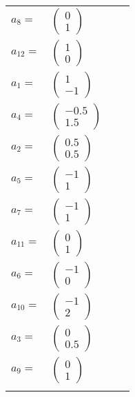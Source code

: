 \documentclass[1p]{elsarticle_modified}
\theoremstyle{definition}
\begin{document}
\begin{tabular}{m{7pt} m{180pt} m{7pt} m{180pt} }
\flushright $a_{8}=$&$\begin{pmatrix}0\\1\end{pmatrix}$ \\
\flushright $a_{12}=$&$\begin{pmatrix}1\\0\end{pmatrix}$ \\
\flushright $a_{1}=$&$\begin{pmatrix}1\\-1\end{pmatrix}$ \\
\flushright $a_{4}=$&$\begin{pmatrix}-0.5\\1.5\end{pmatrix}$ \\
\flushright $a_{2}=$&$\begin{pmatrix}0.5\\0.5\end{pmatrix}$ \\
\flushright $a_{5}=$&$\begin{pmatrix}-1\\1\end{pmatrix}$ \\
\flushright $a_{7}=$&$\begin{pmatrix}-1\\1\end{pmatrix}$ \\
\flushright $a_{11}=$&$\begin{pmatrix}0\\1\end{pmatrix}$ \\
\flushright $a_{6}=$&$\begin{pmatrix}-1\\0\end{pmatrix}$ \\
\flushright $a_{10}=$&$\begin{pmatrix}-1\\2\end{pmatrix}$ \\
\flushright $a_{3}=$&$\begin{pmatrix}0\\0.5\end{pmatrix}$ \\
\flushright $a_{9}=$&$\begin{pmatrix}0\\1\end{pmatrix}$\\&\end{tabular}
\end{document}
